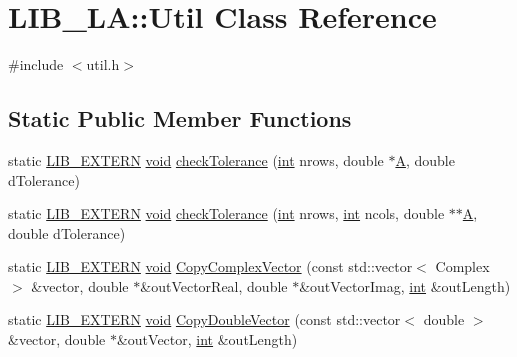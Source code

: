 \hypertarget{class_l_i_b___l_a_1_1_util}{}\section{L\+I\+B\+\_\+\+LA\+:\+:Util Class Reference}
\label{class_l_i_b___l_a_1_1_util}


{\ttfamily \#include $<$util.\+h$>$}

\subsection*{Static Public Member Functions}
\begin{DoxyCompactItemize}
\item 
static \hyperlink{libutil_8h_a48cc004c21e097c0d7c1c5fa8dc03b96}{L\+I\+B\+\_\+\+E\+X\+T\+E\+RN} \hyperlink{lp__lib_8h_ac7828c7b2b31d2e11af17bdb6289c5d9}{void} \hyperlink{class_l_i_b___l_a_1_1_util_a22077dc753db3298fdd8a19b10cc9d45}{check\+Tolerance} (\hyperlink{lp__lib_8h_adeb9ec6400320e4923ac9d836d509ddb}{int} nrows, double $\ast$\hyperlink{fmt_8h_a955f504eccf76b4eb2489c0adab03121}{A}, double d\+Tolerance)
\item 
static \hyperlink{libutil_8h_a48cc004c21e097c0d7c1c5fa8dc03b96}{L\+I\+B\+\_\+\+E\+X\+T\+E\+RN} \hyperlink{lp__lib_8h_ac7828c7b2b31d2e11af17bdb6289c5d9}{void} \hyperlink{class_l_i_b___l_a_1_1_util_ab4e056ccf98d6691ccbb9fab23f0aa04}{check\+Tolerance} (\hyperlink{lp__lib_8h_adeb9ec6400320e4923ac9d836d509ddb}{int} nrows, \hyperlink{lp__lib_8h_adeb9ec6400320e4923ac9d836d509ddb}{int} ncols, double $\ast$$\ast$\hyperlink{fmt_8h_a955f504eccf76b4eb2489c0adab03121}{A}, double d\+Tolerance)
\item 
static \hyperlink{libutil_8h_a48cc004c21e097c0d7c1c5fa8dc03b96}{L\+I\+B\+\_\+\+E\+X\+T\+E\+RN} \hyperlink{lp__lib_8h_ac7828c7b2b31d2e11af17bdb6289c5d9}{void} \hyperlink{class_l_i_b___l_a_1_1_util_aebeb82835b470da692ab8622135cc0a2}{Copy\+Complex\+Vector} (const std\+::vector$<$ Complex $>$ \&vector, double $\ast$\&out\+Vector\+Real, double $\ast$\&out\+Vector\+Imag, \hyperlink{lp__lib_8h_adeb9ec6400320e4923ac9d836d509ddb}{int} \&out\+Length)
\item 
static \hyperlink{libutil_8h_a48cc004c21e097c0d7c1c5fa8dc03b96}{L\+I\+B\+\_\+\+E\+X\+T\+E\+RN} \hyperlink{lp__lib_8h_ac7828c7b2b31d2e11af17bdb6289c5d9}{void} \hyperlink{class_l_i_b___l_a_1_1_util_ae10f61bed0b7b90544034596d4d551d2}{Copy\+Double\+Vector} (const std\+::vector$<$ double $>$ \&vector, double $\ast$\&out\+Vector, \hyperlink{lp__lib_8h_adeb9ec6400320e4923ac9d836d509ddb}{int} \&out\+Length)
$$
\end{DoxyCompactItemize}

